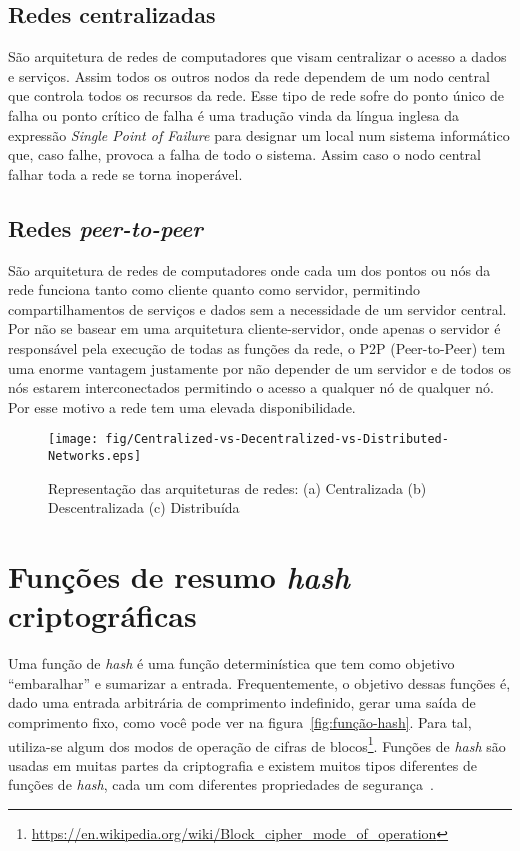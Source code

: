 \subsection{Redes centralizadas}

São arquitetura de redes de computadores que visam centralizar o acesso a dados e serviços.
Assim todos os outros nodos da rede dependem de um nodo central que controla todos os recursos da rede.
Esse tipo de rede sofre do ponto único de falha ou ponto crítico de falha é uma tradução vinda da língua inglesa da expressão \textit{Single Point of Failure} para designar um local num sistema informático que, caso falhe, provoca a falha de todo o sistema.
Assim caso o nodo central falhar toda a rede se torna inoperável.

\subsection{Redes \textit{peer-to-peer}}

São arquitetura de redes de computadores onde cada um dos pontos ou nós da rede funciona tanto como cliente quanto como servidor, permitindo compartilhamentos de serviços e dados sem a necessidade de um servidor central.
Por não se basear em uma arquitetura cliente-servidor, onde apenas o servidor é responsável pela execução de todas as funções da rede, o P2P (Peer-to-Peer) tem uma enorme vantagem justamente por não depender de um servidor e de todos os nós estarem interconectados permitindo o acesso a qualquer nó de qualquer nó. 
Por esse motivo a rede tem uma elevada disponibilidade.%
\begin{figure}[htb!]
\centering\texttt{[image: fig/Centralized-vs-Decentralized-vs-Distributed-Networks.eps]}
\caption[Representação das arquiteturas de redes]
        {\label{fig:tipos-de-redes}Representação das arquiteturas de redes: (a) Centralizada (b) Descentralizada 
        (c) Distribuída~\cite{Imagem1} }
\end{figure}

\section{Funções de resumo \textit{hash} criptográficas}

Uma função de \textit{hash} é uma função determinística que tem como objetivo ``embaralhar'' e sumarizar a entrada.
Frequentemente, o objetivo dessas funções é, dado uma entrada arbitrária de comprimento indefinido, gerar uma saída de comprimento fixo, como você pode ver na figura~\ref{fig:função-hash}.
Para tal, utiliza-se algum dos modos de operação de cifras de blocos\footnote{\url{https://en.wikipedia.org/wiki/Block_cipher_mode_of_operation}}.
Funções de \textit{hash} são usadas em muitas partes da criptografia e existem muitos tipos diferentes de funções de \textit{hash}, cada um com diferentes propriedades de segurança~\cite{HASH1}.

